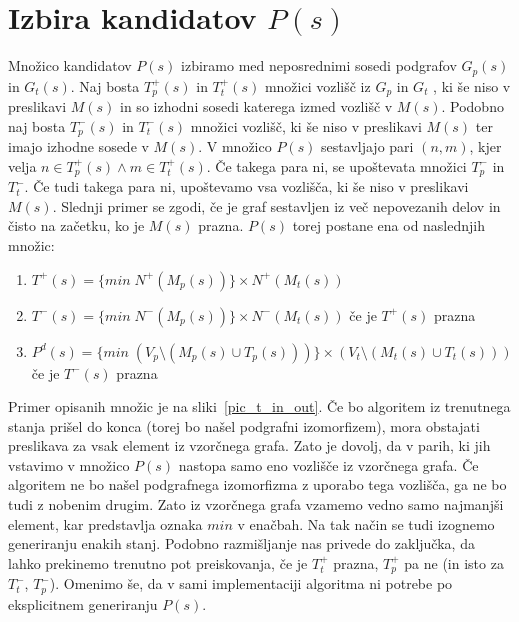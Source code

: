 \documentclass[a4paper, 12pt, ]{book}
\begin{document}
	\section{Izbira kandidatov $P(s)$}
	\label{vf2:candidate}
	
	Množico kandidatov $P(s)$ izbiramo med neposrednimi sosedi podgrafov $G_p(s)$ in $G_t(s)$. Naj bosta $T_p^+(s)$ in $T_t^+(s)$ množici vozlišč iz
	$G_p$ in $G_t$ , ki še niso v preslikavi $M(s)$ in so izhodni sosedi katerega izmed vozlišč v $M(s)$. Podobno naj bosta $T_p^-(s)$ in $T_t^-(s)$ množici
	vozlišč, ki še niso v preslikavi $M(s)$ ter imajo izhodne sosede v $M(s)$. V množico $P(s)$ sestavljajo pari $(n,m)$, kjer velja $n \in T_p^+(s) \wedge
	m \in T_t^+(s)$. Če takega para ni, se upoštevata množici $T_p^-$ in $T_t^-$. Če tudi takega para ni, upoštevamo vsa vozlišča, ki še niso v preslikavi
	$M(s)$. Slednji primer se zgodi, če je graf sestavljen iz več nepovezanih delov in čisto na začetku, ko je $M(s)$ prazna. $P(s)$ torej postane ena od
	naslednjih množic:
	\begin{enumerate}
	\item $T^+(s) = \{min\; N^+(M_p(s))\} \times N^+(M_t(s))$
	\item $T^-(s) = \{min\; N^-(M_p(s))\} \times N^-(M_t(s))$\;\;\; če je $T^+(s)$ prazna
	\item $P^d(s) = \{min\; (V_p \setminus (M_p(s) \cup T_p(s))) \}  \times (V_t \setminus (M_t(s) \cup T_t(s)) )$\;\;\; če je $T^-(s)$ prazna
	\end{enumerate}
	
	Primer opisanih množic je na sliki~\ref{pic_t_in_out}. Če bo algoritem iz trenutnega stanja prišel do konca (torej bo našel podgrafni izomorfizem), mora
	obstajati preslikava za vsak element iz vzorčnega grafa. Zato je dovolj, da v parih, ki jih vstavimo v množico $P(s)$ nastopa samo eno vozlišče iz
	vzorčnega grafa. Če algoritem ne bo našel podgrafnega izomorfizma z uporabo tega vozlišča, ga ne bo tudi z nobenim drugim. Zato iz vzorčnega grafa 
	vzamemo vedno samo najmanjši element, kar predstavlja oznaka $min$ v enačbah. Na tak način se tudi izognemo generiranju enakih stanj. Podobno 
	razmišljanje nas privede do zaključka, da lahko prekinemo trenutno pot preiskovanja, če je $T_t^+$ prazna, $T_p^+$ pa ne (in isto za $T_t^-$,
	$T_p^-$). 	Omenimo še, da v sami implementaciji algoritma ni potrebe po eksplicitnem generiranju $P(s)$.
	
\end{document}
